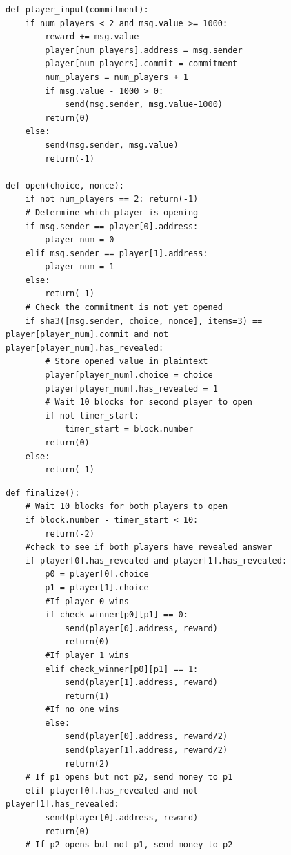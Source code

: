 \documentclass[10pt,twocolumn,letterpaper]{article}
\begin{document}
\begin{figure}
\centering
\begin{minipage}{\columnwidth}%
\begin{mdframed}
\begin{verbatim}
def player_input(commitment):
	if num_players < 2 and msg.value >= 1000:
		reward += msg.value
		player[num_players].address = msg.sender
		player[num_players].commit = commitment
		num_players = num_players + 1
		if msg.value - 1000 > 0:
			send(msg.sender, msg.value-1000)
		return(0)
	else:	
		send(msg.sender, msg.value)
		return(-1)
		
def open(choice, nonce):
	if not num_players == 2: return(-1)
	# Determine which player is opening
	if msg.sender == player[0].address:
		player_num = 0
	elif msg.sender == player[1].address:
		player_num = 1
	else:
		return(-1)
	# Check the commitment is not yet opened
	if sha3([msg.sender, choice, nonce], items=3) == player[player_num].commit and not player[player_num].has_revealed:
		# Store opened value in plaintext
		player[player_num].choice = choice
		player[player_num].has_revealed = 1		
		# Wait 10 blocks for second player to open
		if not timer_start:
			timer_start = block.number
		return(0)
	else:
		return(-1)
\end{verbatim}
\end{mdframed}
\end{minipage}
%
%
\begin{minipage}{\columnwidth}%
\begin{mdframed}
\begin{verbatim}
def finalize():
	# Wait 10 blocks for both players to open
	if block.number - timer_start < 10: 
		return(-2)
	#check to see if both players have revealed answer
	if player[0].has_revealed and player[1].has_revealed:
		p0 = player[0].choice
		p1 = player[1].choice
		#If player 0 wins
		if check_winner[p0][p1] == 0:
			send(player[0].address, reward)
			return(0)
		#If player 1 wins
		elif check_winner[p0][p1] == 1:
			send(player[1].address, reward)
			return(1)
		#If no one wins
		else:
			send(player[0].address, reward/2)
			send(player[1].address, reward/2)
			return(2)
	# If p1 opens but not p2, send money to p1
	elif player[0].has_revealed and not player[1].has_revealed:
		send(player[0].address, reward)
		return(0)
	# If p2 opens but not p1, send money to p2

\end{verbatim}
\end{mdframed}
\end{minipage}
\end{figure}
\end{document}

